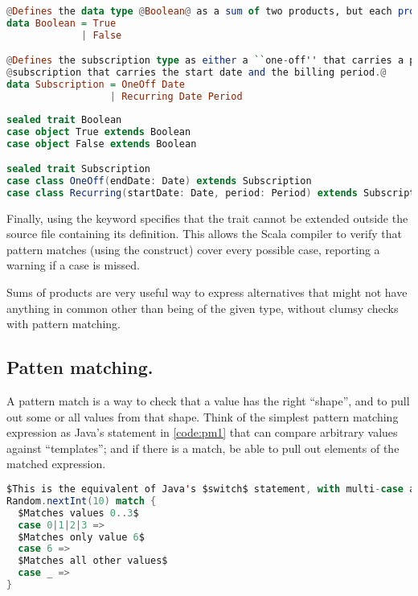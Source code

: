 \documentclass[10 pt]{article}
\begin{document}
\begin{lstlisting}[label={code:sum-haskell}, language=Haskell, escapechar=@]
@Defines the data type @Boolean@ as a sum of two products, but each product only has one value.@
data Boolean = True   
             | False

@Defines the subscription type as either a ``one-off'' that carries a particular end-date, or a recurring@
@subscription that carries the start date and the billing period.@
data Subscription = OneOff Date 
                  | Recurring Date Period
\end{lstlisting}
\begin{lstlisting}[caption={Sum types}, label={code:sum-scala}, language=Scala, escapechar=|]
sealed trait Boolean
case object True extends Boolean
case object False extends Boolean

sealed trait Subscription
case class OneOff(endDate: Date) extends Subscription
case class Recurring(startDate: Date, period: Period) extends Subscription
\end{lstlisting}

Finally, using the keyword  specifies that the trait cannot be extended outside the source file containing its definition. This allows the Scala compiler to verify that pattern matches (using the  construct) cover every possible case, reporting a warning if a case is missed.

Sums of products are very useful way to express alternatives that might not have anything in common other than being of the given type, without clumsy  checks with pattern matching.

\subsection{Patten matching.} 
A pattern match is a way to check that a value has the right ``shape'', and to pull out some or all values from that shape. Think of the simplest pattern matching expression as Java's  statement in \autoref{code:pm1} that can compare arbitrary values against ``templates''; and if there is a match, be able to pull out elements of the matched expression.

\begin{lstlisting}[caption={Pattern matching}, label={code:pm1}, language=Scala, escapechar=$]
$This is the equivalent of Java's $switch$ statement, with multi-case and a default case.$
Random.nextInt(10) match {
  $Matches values 0..3$
  case 0|1|2|3 =>
  $Matches only value 6$
  case 6 =>
  $Matches all other values$
  case _ =>
}
\end{lstlisting}
\end{document}
